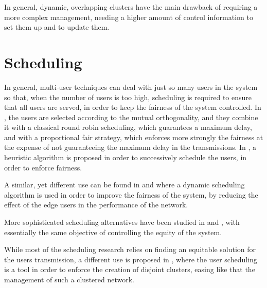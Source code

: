 In general, dynamic, overlapping clusters have the main drawback of requiring a
more complex management, needing a higher amount of control information to set
them up and to update them.


\section{Scheduling} \label{sec:sa_sched}

In general, multi-user techniques can deal with just so many users in the system so that, when the number of users is too high, scheduling is required to ensure
that all users are served, in order to keep the fairness of the system
controlled. In \cite{yoo06}, the users are selected according to the mutual
orthogonality, and they combine it with a classical round robin scheduling,
which guarantees a maximum delay, and with a proportional fair strategy, which
enforces more strongly the fairness at the expense of not guaranteeing the
maximum delay in the transmissions. In \cite{moon13}, a heuristic algorithm is
proposed in order to successively schedule the users, in order to enforce
fairness. 

A similar, yet different use can be found in \cite{papadogiannis08} and
\cite{kaviani10} where a dynamic scheduling algorithm is used in order to
improve the fairness of the system, by reducing the effect of the edge users in
the performance of the network.

More sophisticated scheduling alternatives have been studied in \cite{yi11} and
\cite{ko12}, with essentially the same objective of controlling the equity of
the system.

While most of the scheduling research relies on finding an equitable solution
for the users transmission, a different use is proposed in \cite{baracca12},
where the user scheduling is a tool in order to enforce the creation of disjoint
clusters, easing like that the management of such a clustered network.
